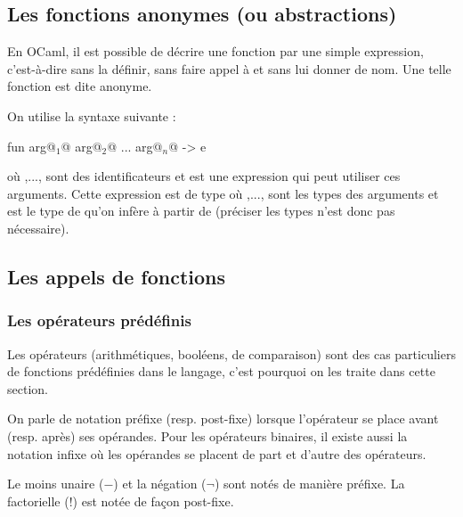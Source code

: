  	\subsection{Les fonctions anonymes (ou abstractions)}
 		
 		En OCaml, il est possible de décrire une fonction par une simple expression, c'est-à-dire sans la définir, sans faire appel à  et sans lui donner de nom. Une telle fonction est dite anonyme.
 		\begin{Syntaxe}
 		On utilise la syntaxe suivante : 
 			\begin{Caml}
 						  fun arg@$_1$@ arg@$_2$@ ... arg@$_n$@ -> e
 			\end{Caml}
 		
 		où ,..., sont des identificateurs et  est une expression qui peut utiliser ces arguments. \nt
 		Cette expression est de type  où ,..., sont les types des arguments et  est le type de  qu'on infère à partir de  (préciser les types n'est donc pas nécessaire).
 		\end{Syntaxe}
 		
 	\subsection{Les appels de fonctions}
 	
 		\subsubsection{Les opérateurs prédéfinis}
 		
 			Les opérateurs (arithmétiques, booléens, de comparaison) sont des cas particuliers de fonctions prédéfinies dans le langage, c'est pourquoi on les traite dans cette section.
 			
 			\begin{Definition}
 				On parle de notation préfixe (resp.\! post-fixe) lorsque l'opérateur se place avant (resp.\! après) ses opérandes. Pour les opérateurs binaires, il existe aussi la notation infixe où les opérandes se placent de part et d'autre des opérateurs.
 			\end{Definition}
 			
 			\begin{Exemple}
 				Le moins unaire (\(-\)) et la négation (\(\neg\)) sont notés de manière préfixe. La factorielle (\(!\)) est notée de façon post-fixe.
 			\end{Exemple}
 		
